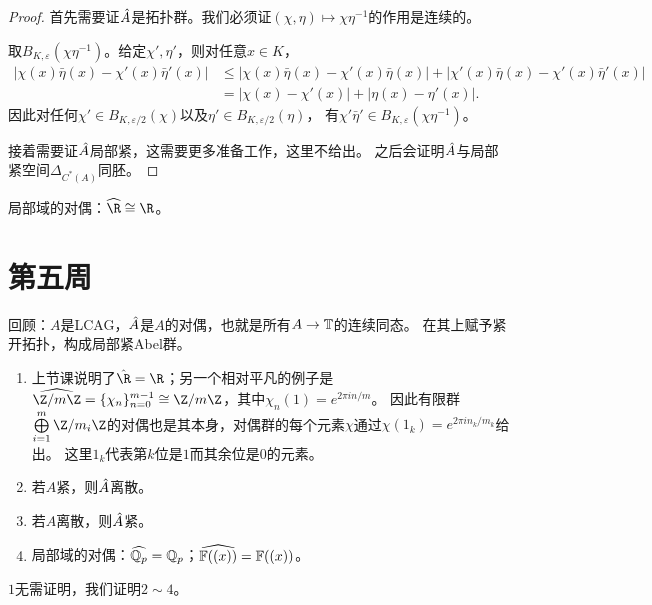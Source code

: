 \begin{proof}
    首先需要证$\hat{A}$是拓扑群。我们必须证$(\chi,\eta) \mapsto \chi\eta^{-1}$的作用是连续的。

    取$B_{K,\varepsilon}(\chi\eta^{-1})$。给定$\chi',\eta'$，则对任意$x \in K$，\begin{equation*}
        \begin{split}
            |\chi(x)\bar{\eta}(x) - \chi'(x)\bar{\eta}'(x)| & \leqslant |\chi(x)\bar{\eta}(x) - \chi'(x)\bar{\eta}(x)|+|\chi'(x)\bar{\eta}(x) - \chi'(x)\bar{\eta}'(x)|
            \\ & = |\chi(x) - \chi'(x)|+|\eta(x) - \eta'(x)|.
        \end{split}
    \end{equation*}
    因此对任何$\chi' \in B_{K,\varepsilon/2}(\chi)$以及$\eta' \in B_{K,\varepsilon/2}(\eta)$，
    有$\chi'\bar{\eta}' \in B_{K,\varepsilon}(\chi\eta^{-1})$。

    接着需要证$\hat{A}$局部紧，这需要更多准备工作，这里不给出。
    之后会证明$\hat{A}$与局部紧空间$\Delta_{C^*(A)}$同胚。
\end{proof}
\begin{example}
    局部域的对偶：$\widehat{\R} \cong \R$。
\end{example}
\section{第五周}
回顾：$A$是LCAG，$\hat{A}$是$A$的对偶，也就是所有$A \to \mathbb{T}$的连续同态。
在其上赋予紧开拓扑，构成局部紧Abel群。

\begin{proposition}
    \begin{enumerate}
        \item 上节课说明了$\hat{\R} = \R$；另一个相对平凡的例子是$\widehat{\Z/m\Z} = \{\chi_n\}_{n=0}^{m-1} \cong \Z/m\Z$，其中$\chi_n(1) = e^{2\pi in/m}$。
        因此有限群$\bigoplus\limits_{i=1}^m \Z/m_i\Z$的对偶也是其本身，对偶群的每个元素$\chi$通过$\chi(1_k) = e^{2\pi i n_k/m_k}$给出。
        这里$1_k$代表第$k$位是$1$而其余位是$0$的元素。
        \item 若$A$紧，则$\hat{A}$离散。
        \item 若$A$离散，则$\hat{A}$紧。
        \item 局部域的对偶：$\widehat{\mathbb{Q}_p} = \mathbb{Q}_p$；$\widehat{\mathbb{F}((x))} = \mathbb{F}((x))$。
    \end{enumerate}
\end{proposition}
$1$无需证明，我们证明$2 \sim 4$。

